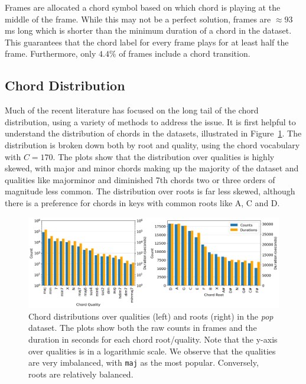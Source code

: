 Frames are allocated a chord symbol based on which chord is playing at the middle of the frame. While this may not be a perfect solution, frames are $\approx93$ms long which is shorter than the minimum duration of a chord in the dataset. This guarantees that the chord label for every frame plays for at least half the frame. Furthermore, only $4.4\%$ of frames include a chord transition.

\subsection{Chord Distribution}

Much of the recent literature has focused on the long tail of the chord distribution, using a variety of methods to address the issue. It is first helpful to understand the distribution of chords in the datasets, illustrated in Figure~\ref{fig:chord-distribution}. The distribution is broken down both by root and quality, using the chord vocabulary with $C=170$. The plots show that the distribution over qualities is highly skewed, with major and minor chords making up the majority of the dataset and qualities like majorminor and diminished 7th chords two or three orders of magnitude less common. The distribution over roots is far less skewed, although there is a preference for chords in keys with common roots like A, C and D.

\begin{figure}[H]
    \centering
    \includegraphics[width=1.0\textwidth]{figures/chord_distribution.png}
    \caption{Chord distributions over qualities (left) and roots (right) in the \emph{pop} dataset. The plots show both the raw counts in frames and the duration in seconds for each chord root/quality. Note that the y-axis over qualities is in a logarithmic scale. We observe that the qualities are very imbalanced, with \texttt{maj} as the most popular. Conversely, roots are relatively balanced.}\label{fig:chord-distribution}
\end{figure}


